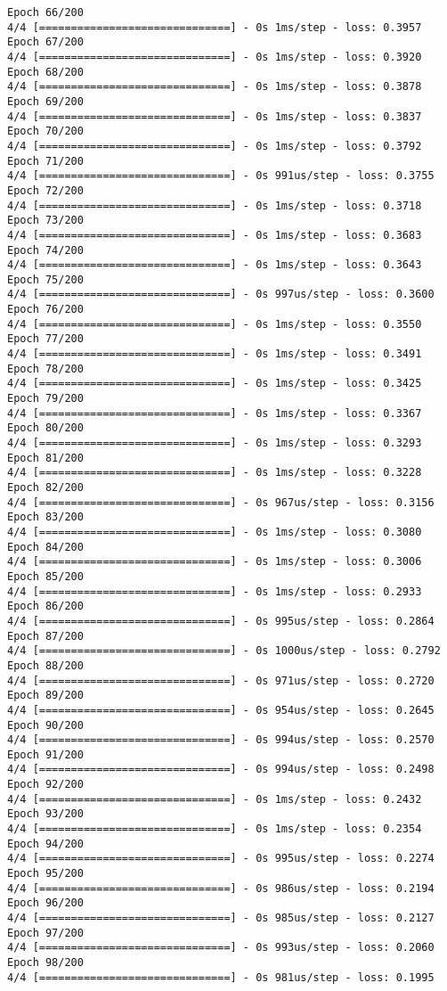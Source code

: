 \documentclass[11pt]{article}
\begin{document}
\begin{Verbatim}[commandchars=\\\{\}]
Epoch 66/200
4/4 [==============================] - 0s 1ms/step - loss: 0.3957
Epoch 67/200
4/4 [==============================] - 0s 1ms/step - loss: 0.3920
Epoch 68/200
4/4 [==============================] - 0s 1ms/step - loss: 0.3878
Epoch 69/200
4/4 [==============================] - 0s 1ms/step - loss: 0.3837
Epoch 70/200
4/4 [==============================] - 0s 1ms/step - loss: 0.3792
Epoch 71/200
4/4 [==============================] - 0s 991us/step - loss: 0.3755
Epoch 72/200
4/4 [==============================] - 0s 1ms/step - loss: 0.3718
Epoch 73/200
4/4 [==============================] - 0s 1ms/step - loss: 0.3683
Epoch 74/200
4/4 [==============================] - 0s 1ms/step - loss: 0.3643
Epoch 75/200
4/4 [==============================] - 0s 997us/step - loss: 0.3600
Epoch 76/200
4/4 [==============================] - 0s 1ms/step - loss: 0.3550
Epoch 77/200
4/4 [==============================] - 0s 1ms/step - loss: 0.3491
Epoch 78/200
4/4 [==============================] - 0s 1ms/step - loss: 0.3425
Epoch 79/200
4/4 [==============================] - 0s 1ms/step - loss: 0.3367
Epoch 80/200
4/4 [==============================] - 0s 1ms/step - loss: 0.3293
Epoch 81/200
4/4 [==============================] - 0s 1ms/step - loss: 0.3228
Epoch 82/200
4/4 [==============================] - 0s 967us/step - loss: 0.3156
Epoch 83/200
4/4 [==============================] - 0s 1ms/step - loss: 0.3080
Epoch 84/200
4/4 [==============================] - 0s 1ms/step - loss: 0.3006
Epoch 85/200
4/4 [==============================] - 0s 1ms/step - loss: 0.2933
Epoch 86/200
4/4 [==============================] - 0s 995us/step - loss: 0.2864
Epoch 87/200
4/4 [==============================] - 0s 1000us/step - loss: 0.2792
Epoch 88/200
4/4 [==============================] - 0s 971us/step - loss: 0.2720
Epoch 89/200
4/4 [==============================] - 0s 954us/step - loss: 0.2645
Epoch 90/200
4/4 [==============================] - 0s 994us/step - loss: 0.2570
Epoch 91/200
4/4 [==============================] - 0s 994us/step - loss: 0.2498
Epoch 92/200
4/4 [==============================] - 0s 1ms/step - loss: 0.2432
Epoch 93/200
4/4 [==============================] - 0s 1ms/step - loss: 0.2354
Epoch 94/200
4/4 [==============================] - 0s 995us/step - loss: 0.2274
Epoch 95/200
4/4 [==============================] - 0s 986us/step - loss: 0.2194
Epoch 96/200
4/4 [==============================] - 0s 985us/step - loss: 0.2127
Epoch 97/200
4/4 [==============================] - 0s 993us/step - loss: 0.2060
Epoch 98/200
4/4 [==============================] - 0s 981us/step - loss: 0.1995

\end{Verbatim}
\end{document}

